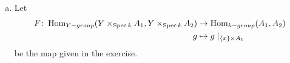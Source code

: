 \newcommand{\sheet}{3}




\maketitle{}

\begin{exercise}{1}
    \begin{enumerate}[a)]
        \item{


                
                Let
                \begin{equation*}
                    \begin{split}
                        F \colon  \operatorname{Hom}_{Y-group}(Y \times_{\operatorname{Spec} k} A_1, Y
                        \times_{\operatorname{Spec} k} A_2) &\to \operatorname{Hom}_{k-group}(A_1, A_2) \\
                        g &\mapsto g \mid_{\{x\} \times A_1} 
                    \end{split}
                \end{equation*}
                be the map given in the exercise.

}
\end{enumerate}
\end{exercise}

